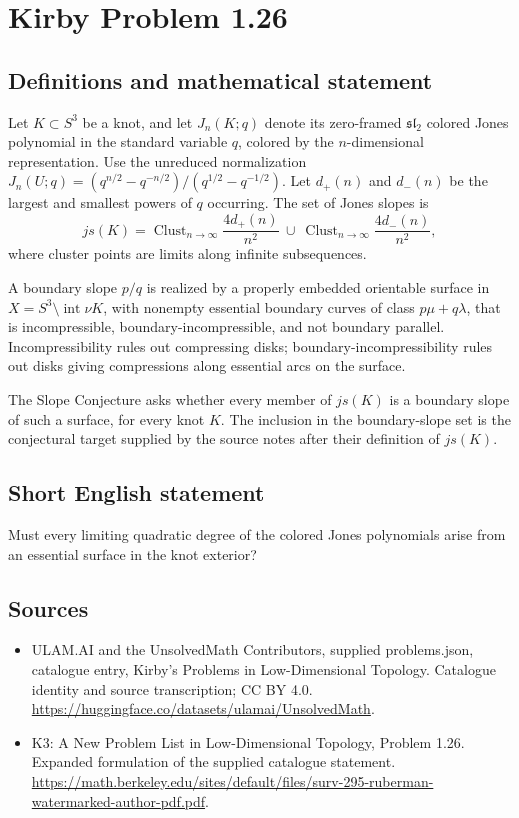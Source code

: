 \documentclass[11pt,a4paper]{article}
\begin{document}
\section*{Kirby Problem 1.26}\label{statement}

\subsection{Definitions and mathematical statement}
Let $K\subset S^3$ be a knot, and let $J_n(K;q)$ denote its zero-framed
$\mathfrak{sl}_2$ colored Jones polynomial in the standard variable $q$, colored
by the $n$-dimensional representation. Use the unreduced normalization
$J_n(U;q)=(q^{n/2}-q^{-n/2})/(q^{1/2}-q^{-1/2})$.
Let $d_+(n)$ and $d_-(n)$ be the largest and smallest powers of $q$ occurring.
The set of Jones slopes is
\[
js(K)=\operatorname{Clust}_{n\to\infty}\frac{4d_+(n)}{n^2}
\ \cup\ \operatorname{Clust}_{n\to\infty}\frac{4d_-(n)}{n^2},
\]
where cluster points are limits along infinite subsequences.

A boundary slope $p/q$ is realized by a properly embedded orientable surface
in $X=S^3\setminus\operatorname{int}\nu K$, with nonempty essential boundary
curves of class $p\mu+q\lambda$, that is incompressible, boundary-incompressible,
and not boundary parallel. Incompressibility rules out compressing disks;
boundary-incompressibility rules out disks giving compressions along essential
arcs on the surface.

The Slope Conjecture asks whether every member of $js(K)$ is a boundary slope
of such a surface, for every knot $K$. The inclusion in the boundary-slope set
is the conjectural target supplied by the source notes after their definition
of $js(K)$.
\subsection{Short English statement}
Must every limiting quadratic degree of the colored Jones polynomials arise from an essential surface in the knot exterior?
\subsection{Sources}
\begin{itemize}
\item[S1] ULAM.AI and the UnsolvedMath Contributors, supplied problems.json, catalogue entry, Kirby's Problems in Low-Dimensional Topology. Catalogue identity and source transcription; CC BY 4.0.
\url{https://huggingface.co/datasets/ulamai/UnsolvedMath}.
\item[S2] K3: A New Problem List in Low-Dimensional Topology, Problem 1.26. Expanded formulation of the supplied catalogue statement.
\url{https://math.berkeley.edu/sites/default/files/surv-295-ruberman-watermarked-author-pdf.pdf}.
\end{itemize}
\end{document}
